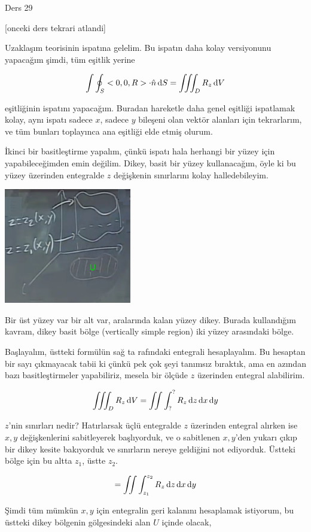 \documentclass[12pt,fleqn]{article}\usepackage{../../common}
\begin{document}
Ders 29

[onceki ders tekrari atlandi]

Uzaklaşım teorisinin ispatına gelelim. Bu ispatın daha kolay versiyonunu
yapacağım şimdi, tüm eşitlik yerine

$$
\int \oint_S < 0,0,R > \cdot \hat{n} \,\mathrm{d} S =
\iiint_D R_z \,\mathrm{d} V
$$

eşitliğinin ispatını yapacağım. Buradan hareketle daha genel eşitliği
ispatlamak kolay, aynı ispatı sadece $x$, sadece $y$ bileşeni olan
vektör alanları için tekrarlarım, ve tüm bunları toplayınca ana eşitliği
elde etmiş olurum.

İkinci bir basitleştirme yapalım, çünkü ispatı hala herhangi bir yüzey için
yapabileceğimden emin değilim. Dikey, basit bir yüzey kullanacağım, öyle ki
bu yüzey üzerinden entegralde $z$ değişkenin sınırlarını kolay halledebileyim.

\includegraphics[width=15em]{calc_multi_29_01.png}

Bir üst yüzey var bir alt var, aralarında kalan yüzey dikey. Burada kullandığım
kavram, dikey basit bölge (vertically simple region) iki yüzey arasındaki bölge.

Başlayalım, üstteki formülün sağ ta rafındaki entegrali hesaplayalım. Bu
hesaptan bir sayı çıkmayacak tabii ki çünkü pek çok şeyi tanımsız bıraktık, ama
en azından bazı basitleştirmeler yapabiliriz, mesela bir ölçüde $z$ üzerinden
entegral alabilirim. 

$$
\iiint_D R_z \,\mathrm{d} V = \iint \int_?^? R_z \,\mathrm{d} z \,\mathrm{d} x \,\mathrm{d} y
$$

$z$'nin sınırları nedir? Hatırlarsak üçlü entegralde $z$ üzerinden entegral
alırken ise $x,y$ değişkenlerini sabitleyerek başlıyorduk, ve o sabitlenen
$x,y$'den yukarı çıkıp bir dikey kesite bakıyorduk ve sınırların nereye
geldiğini not ediyorduk. Üstteki bölge için bu altta $z_1$, üstte $z_2$. 

$$
= \iint \int_{z_1}^{z_2} R_z \,\mathrm{d} z \,\mathrm{d} x \,\mathrm{d} y
$$

Şimdi tüm mümkün $x,y$ için entegralin geri kalanını hesaplamak istiyorum,
bu üstteki dikey bölgenin gölgesindeki alan $U$ içinde olacak, 
\end{document}
